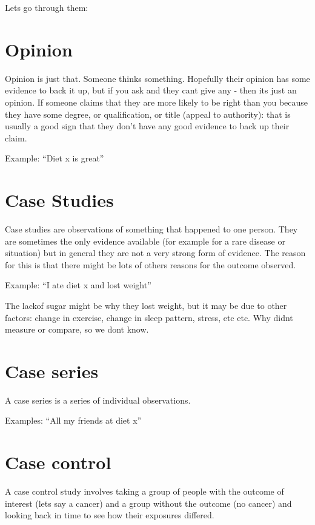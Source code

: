 \documentclass[
]{book}
\theoremstyle{definition}
\theoremstyle{definition}
\theoremstyle{definition}
\theoremstyle{definition}
\theoremstyle{remark}
\begin{document}
Lets go through them:

\hypertarget{opinion}{%
\section{Opinion}\label{opinion}}

Opinion is just that. Someone thinks something. Hopefully their opinion has some evidence to back it up, but if you ask and they cant give any - then its just an opinion. If someone claims that they are more likely to be right than you because they have some degree, or qualification, or title (appeal to authority): that is usually a good sign that they don't have any good evidence to back up their claim.

Example: ``Diet x is great''

\hypertarget{case-studies}{%
\section{Case Studies}\label{case-studies}}

Case studies are observations of something that happened to one person. They are sometimes the only evidence available (for example for a rare disease or situation) but in general they are not a very strong form of evidence. The reason for this is that there might be lots of others reasons for the outcome observed.

Example: ``I ate diet x and lost weight''

The lackof sugar might be why they lost weight, but it may be due to other factors: change in exercise, change in sleep pattern, stress, etc etc. Why didnt measure or compare, so we dont know.

\hypertarget{case-series}{%
\section{Case series}\label{case-series}}

A case series is a series of individual observations.

Examples: ``All my friends at diet x''

\hypertarget{case-control}{%
\section{Case control}\label{case-control}}

A case control study involves taking a group of people with the outcome of interest (lets say a cancer) and a group without the outcome (no cancer) and looking back in time to see how their exposures differed.
\end{document}
